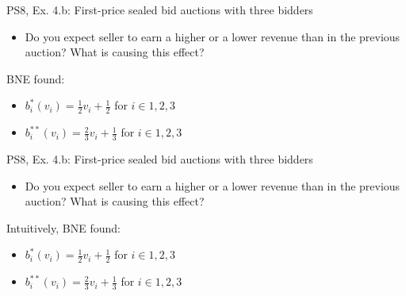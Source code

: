 \begin{frame}{PS8, Ex. 4.b: First-price sealed bid auctions with three bidders}
    \begin{itemize}
      \item[(b)] Do you expect seller to earn a higher or a lower revenue than in the previous auction? What is causing this effect?
    \end{itemize}
    \vspace{-8pt}
    \begin{multicols}{2}
    \vfill\null\columnbreak
    BNE found:
    \begin{itemize}
      \item[(3.a)] $b_i^{*}(v_i)=\frac{1}{2}v_i+\frac{1}{2}$ for $i\in1,2,3$
      \item[(4.a)] $b_i^{**}(v_i)=\frac{2}{3}v_i+\frac{1}{3}$ for $i\in1,2,3$
    \end{itemize}
    \vfill\null
    \end{multicols}
\end{frame}
\begin{frame}{PS8, Ex. 4.b: First-price sealed bid auctions with three bidders}
    \begin{itemize}
      \item[(b)] Do you expect seller to earn a higher or a lower revenue than in the previous auction? What is causing this effect?
    \end{itemize}
    \vspace{-8pt}
    \begin{multicols}{2}
    Intuitively, 
    \vfill\null\columnbreak
    BNE found:
    \begin{itemize}
      \item[(3.a)] $b_i^{*}(v_i)=\frac{1}{2}v_i+\frac{1}{2}$ for $i\in1,2,3$
      \item[(4.a)] $b_i^{**}(v_i)=\frac{2}{3}v_i+\frac{1}{3}$ for $i\in1,2,3$
    \end{itemize}
    \vfill\null
    \end{multicols}
\end{frame}

